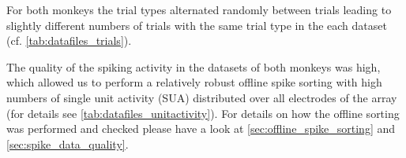 {For both monkeys the trial types alternated randomly between trials leading to slightly different numbers of trials with the same trial type in the each dataset (cf. \cref{tab:datafiles_trials}). 



The quality of the spiking activity in the datasets of both monkeys was high, which allowed us to perform a relatively robust offline spike sorting with high numbers of single unit activity (SUA) distributed over all electrodes of the array (for details see \ref{tab:datafiles_unitactivity}). For details on how the offline sorting was performed and checked please have a look at \cref{sec:offline_spike_sorting} and \cref{sec:spike_data_quality}. 
% 
% 
}
